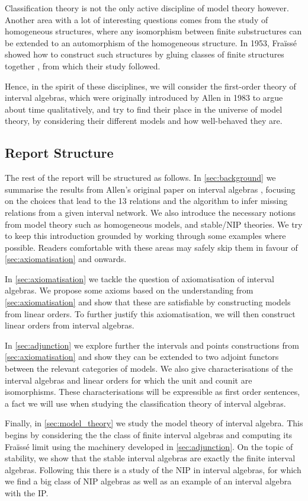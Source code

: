 Classification theory is not the only active discipline of model theory however. Another
area with a lot of interesting questions comes from the study of homogeneous structures,
where any isomorphism between finite substructures can be extended to an automorphism of
the homogeneous structure. In 1953, Fraïssé showed how to construct such structures
by gluing classes of finite structures together \cite{fraisse1953certaines},
from which their study followed.

Hence, in the spirit of these disciplines, we will consider the first-order theory of
interval algebras, which were originally introduced by Allen in 1983 to argue about time
qualitatively, and try to find their place in the universe of model
theory, by considering their different models and how well-behaved they are.

\subsection{Report Structure}%
\label{sub:report_structure}

The rest of the report will be structured as follows. In
\cref{sec:background} we summarise the results from Allen's original paper
on interval algebras \cite{allen83}, focusing on the choices that lead to
the 13 relations and the algorithm to infer missing relations from a given
interval network. We also introduce the necessary notions from model theory
such as homogeneous models, and stable/NIP theories. We try to keep this
introduction grounded by working through some examples where possible.
Readers comfortable with these areas may safely skip them in favour of
\cref{sec:axiomatisation} and onwards.

In \cref{sec:axiomatisation} we tackle the question of axiomatisation of
interval algebras. We propose some axioms based on the understanding from
\cref{sec:axiomatisation} and show that these are satisfiable by
constructing models from linear orders. To further justify this
axiomatisation, we will then construct linear orders from interval
algebras.

In \cref{sec:adjunction} we explore further the intervals and points
constructions from \cref{sec:axiomatisation} and show they can be extended to two adjoint
functors between the relevant categories of models. We also give characterisations of
the interval algebras and linear orders for which the unit and counit are isomorphisms.
These characterisations will be expressible as first order sentences, a fact we will use
when studying the classification theory of interval algebras.

Finally, in \cref{sec:model_theory} we study the model theory of interval algebra. This
begins by considering the the class of finite interval algebras and computing its
Fraïssé limit using the machinery developed in \cref{sec:adjunction}. On the topic of
stability, we show that the stable interval algebras are exactly the finite interval
algebras. Following this there is a study of the NIP in interval algebras, for which
we find a big class of NIP algebras as well as an example of an interval algebra with the
IP.

